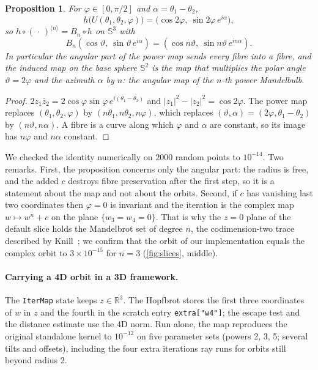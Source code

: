 \documentclass[11pt,a4paper]{article}
\newtheorem{proposition}{Proposition}
\theoremstyle{remark}
\newcommand{\R}{\mathbb{R}}
\newcommand{\Sph}{\mathbb{S}}
\newcommand{\code}[1]{\texttt{#1}}
\begin{document}
\begin{proposition}\label{prop:hopf}
For $\varphi\in[0,\pi/2]$ and $\alpha=\theta_1-\theta_2$,
\begin{equation}
h\bigl(U(\theta_1,\theta_2,\varphi)\bigr)=\bigl(\cos2\varphi,\ \sin2\varphi\,e^{i\alpha}\bigr),
\end{equation}
so $h\circ(\,\cdot\,)^{\langle n\rangle}=B_n\circ h$ on $\Sph^3$ with
\begin{equation}
B_n(\cos\vartheta,\ \sin\vartheta\,e^{i\alpha})=(\cos n\vartheta,\ \sin n\vartheta\,e^{in\alpha}).
\end{equation}
In particular the angular part of the power map sends every fibre into a fibre, and the induced map on the base sphere $\Sph^2$ is the
map that multiplies the polar angle $\vartheta=2\varphi$ and the azimuth $\alpha$ by $n$: the angular map of the $n$-th power Mandelbulb.
\end{proposition}
\begin{proof}
$2z_1\bar z_2=2\cos\varphi\sin\varphi\,e^{i(\theta_1-\theta_2)}$ and $|z_1|^2-|z_2|^2=\cos2\varphi$.  The power map replaces $(\theta_1,\theta_2,\varphi)$
by $(n\theta_1,n\theta_2,n\varphi)$, which replaces $(\vartheta,\alpha)=(2\varphi,\theta_1-\theta_2)$ by $(n\vartheta,n\alpha)$.  A fibre is a curve along which
$\varphi$ and $\alpha$ are constant, so its image has $n\varphi$ and $n\alpha$ constant.
\end{proof}

We checked the identity numerically on $2000$ random points to $10^{-14}$.  Two remarks.  First, the proposition concerns only the angular part:
the radius is free, and the added $c$ destroys fibre preservation after the first step, so it is a statement about the map and not about the
orbits.  Second, if $c$ has vanishing last two coordinates then $\varphi=0$ is invariant and the iteration is the complex map $w\mapsto w^n+c$ on the
plane $\{w_3=w_4=0\}$.  That is why the $z=0$ plane of the default slice holds the Mandelbrot set of degree $n$, the codimension-two trace
described by Knill~\cite{knill2023}; we confirm that the orbit of our implementation equals the complex orbit to $3\times10^{-15}$ for $n=3$ (\cref{fig:slices}, middle).

\paragraph{Carrying a 4D orbit in a 3D framework.}
The \code{IterMap} state keeps $z\in\R^3$.  The Hopfbrot stores the first three coordinates of $w$ in $z$ and the fourth in the scratch
entry \code{extra["w4"]}; the escape test and the distance estimate use the 4D norm.  Run alone, the map reproduces the original standalone kernel to
$10^{-12}$ on five parameter sets (powers 2, 3, 5; several tilts and offsets), including the four extra iterations ray runs for orbits still beyond radius 2.
\end{document}
